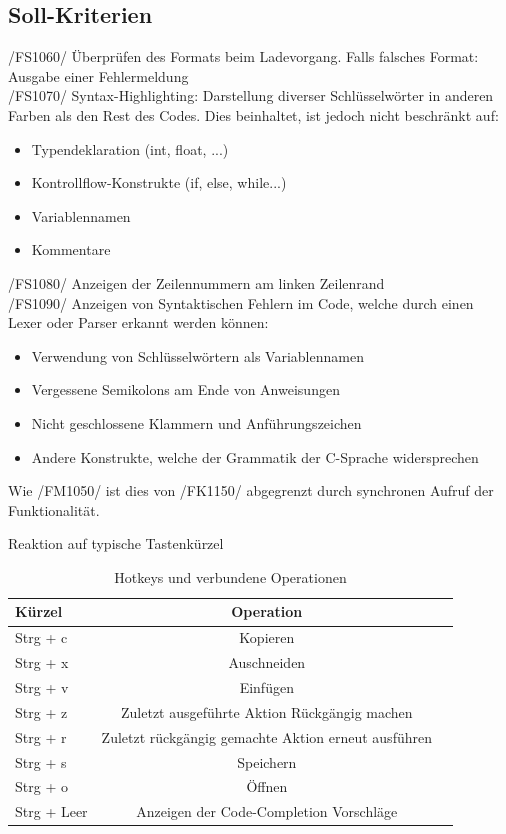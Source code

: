 \documentclass[a4paper]{scrreprt}
\begin{document}
\subsection{Soll-Kriterien}
/FS1060/ Überprüfen des Formats beim Ladevorgang. Falls falsches Format: Ausgabe einer Fehlermeldung \\
/FS1070/ Syntax-Highlighting: Darstellung diverser Schlüsselwörter in anderen Farben als den Rest des Codes. Dies beinhaltet, ist jedoch nicht beschränkt auf: 
\begin{itemize}
\item Typendeklaration (int, float, ...)
\item Kontrollflow-Konstrukte (if, else, while...)
\item Variablennamen
\item Kommentare
\end{itemize}
/FS1080/ Anzeigen der Zeilennummern am linken Zeilenrand \\
/FS1090/ Anzeigen von Syntaktischen Fehlern im Code, welche durch einen Lexer oder Parser erkannt werden können: 
\begin{itemize}
\item Verwendung von Schlüsselwörtern als Variablennamen 
\item Vergessene Semikolons am Ende von Anweisungen
\item Nicht geschlossene Klammern und Anführungszeichen
\item Andere Konstrukte, welche der Grammatik der C-Sprache widersprechen
\end{itemize}
Wie /FM1050/ ist dies von /FK1150/ abgegrenzt durch synchronen Aufruf der Funktionalität.

Reaktion auf typische Tastenkürzel\\
\begin{table}[H]
\caption{Hotkeys und verbundene Operationen}
\begin{tabular}{lcr} 
Kürzel & Operation \\
\hline 
Strg + c & Kopieren \\
Strg + x & Auschneiden \\
Strg + v & Einfügen \\
Strg + z & Zuletzt ausgeführte Aktion Rückgängig machen \\
Strg + r & Zuletzt rückgängig gemachte Aktion erneut ausführen \\
Strg + s & Speichern \\
Strg + o & Öffnen \\
Strg + Leer & Anzeigen der Code-Completion Vorschläge\\
\end{tabular}
\label{table:Hotkeys_and_operations}
\end{table}
\end{document}
